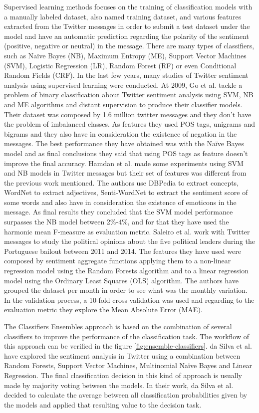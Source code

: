 Supervised learning methods focuses on the training of classification models with a manually labeled dataset, also named training dataset,  and various features extracted from the Twitter messages in order to submit a test dataset under the model and have an automatic prediction regarding the polarity of the sentiment (positive, negative or neutral) in the message. There are many types of classifiers, such as Naïve Bayes (NB), Maximum Entropy (ME), Support Vector Machines (SVM), Logistic Regression (LR), Random Forest (RF) or even Conditional Random Fields (CRF). In the last few years, many studies of Twitter sentiment analysis using supervised learning were conducted. At 2009, Go et al. \cite{kn:Go2009} tackle a problem of binary classification about Twitter sentiment analysis using SVM, NB and ME algorithms and distant supervision to produce their classifier models. Their dataset was composed by 1.6 million twitter messages and they don't have the problem of imbalanced classes. As features they used POS tags, unigrams and bigrams and they also have in consideration the existence of negation in the messages. The best performance they have obtained was with the Naïve Bayes model and as final conclusions they said that using POS tags as feature doesn't improve the final accuracy. 
Hamdan et al. \cite{kn:hamdan2013} made some experiments using SVM and NB models in Twitter messages but their set of features was different from the previous work mentioned. The authors use DBPedia to extract concepts, WordNet to extract adjectives, Senti-WordNet to extract the sentiment score of some words and also have in consideration the existence of emoticons in the message. As final results they concluded that the SVM model performance surpasses the NB model between 2\%-4\%, and for that they have used the harmonic mean F-measure as evaluation metric. 
Saleiro et al. \cite{kn:Saleiro2016} work with Twitter messages to study the political opinions about the five political leaders during the Portuguese bailout between 2011 and 2014. The features they have used were composed by sentiment aggregate functions applying them to a non-linear regression model using the Random Forests algorithm and to a linear regression model using the Ordinary Least Squares (OLS) algorithm. The authors have grouped the dataset per month in order to see what was the monthly variation. In the validation process, a 10-fold cross validation was used and regarding to the evaluation metric they explore the Mean Absolute Error (MAE).

The Classifiers Ensembles approach is based on the combination of several classifiers to improve the performance of the classification task. The workflow of this approach can be verified in the figure \ref{fig:ensemble-classifiers}. da Silva et al. \cite{kn:daSilva2014} have explored the sentiment analysis in Twitter using a combination between Random Forests, Support Vector Machines, Multinomial Naïve Bayes and Linear Regression. The final classification decision in this kind of approach is usually made by majority voting between the models. In their work, da Silva et al. decided to calculate the average between all classification probabilities given by the models and applied that resulting value to the decision task.

